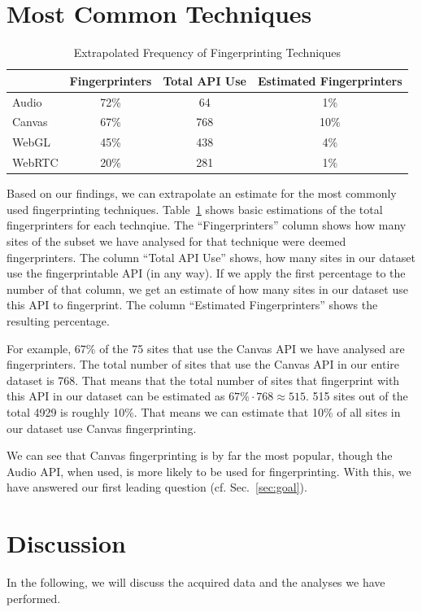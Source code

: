 \documentclass[
    fontsize=12pt,
    headings=small,
    parskip=half,
    bibliography=totoc,
    numbers=noenddot,
    open=any
    ]{scrreprt}
\begin{document}
\section{Most Common Techniques}
\begin{table}
\centering
\caption{Extrapolated Frequency of Fingerprinting Techniques}
\begin{tabular}{l c c c}
    \toprule
    & Fingerprinters & Total API Use & Estimated Fingerprinters \\
    \midrule
    Audio & 72\% & 64 & 1\% \\
    Canvas & 67\% & 768 & 10\% \\
    WebGL & 45\% & 438 & 4\% \\
    WebRTC & 20\% & 281 & 1\% \\
    \bottomrule
\end{tabular}
\label{table:technique_frequency}
\end{table}

Based on our findings, we can extrapolate an estimate for the most commonly used fingerprinting
techniques.
Table~\ref{table:technique_frequency} shows basic estimations of the total fingerprinters
for each technqiue. The ``Fingerprinters'' column shows how many sites of the subset
we have analysed for that technique were deemed fingerprinters. The column ``Total API Use''
shows, how many sites in our dataset use the fingerprintable API (in any way).
If we apply the first percentage to the number of that column, we get an estimate
of how many sites in our dataset use this API to fingerprint. The column ``Estimated Fingerprinters''
shows the resulting percentage.

For example, 67\% of the 75 sites that use the Canvas API we have analysed are fingerprinters.
The total number of sites that use the Canvas API in our entire dataset is 768.
That means that the total number of sites that fingerprint with this API in our dataset
can be estimated as $ 67\% \cdot 768 \approx 515  $. 515 sites out of the total 4929
is roughly 10\%. That means we can estimate that 10\% of all sites in our dataset use Canvas
fingerprinting.

We can see that Canvas fingerprinting is by far the most popular, though the Audio API, when used,
is more likely to be used for fingerprinting.
With this, we have answered our first leading question (cf. Sec.~\ref{sec:goal}).


\section{Discussion}
\label{sec:data_discussion}
In the following, we will discuss the acquired data and the analyses we have performed.
\end{document}
